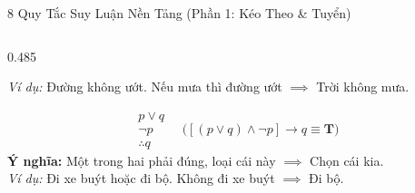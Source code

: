 \documentclass[aspectratio=169, 10pt]{beamer}
\begin{document}
\begin{frame}{8 Quy Tắc Suy Luận Nền Tảng (Phần 1: Kéo Theo \& Tuyển)}
\begin{columns}[t, onlytextwidth]
\begin{column}{0.485\textwidth}
\begin{cozyDef}
        \textit{Ví dụ:} Đường không ướt. Nếu mưa thì đường ướt $\implies$ Trời không mưa.
      \end{cozyDef}
      \vspace{0.02cm}
      \begin{cozyDef}
        \scriptsize
        \vspace{-0.16cm}
        $$\begin{array}{l} p \lor q \\ \neg p \\ \hline \therefore q \end{array} \quad \Big( [(p \lor q) \land \neg p] \to q \equiv \mathbf{T} \Big)$$
        \textbf{Ý nghĩa:} Một trong hai phải đúng, loại cái này $\implies$ Chọn cái kia.\\[2.5pt]
        \textit{Ví dụ:} Đi xe buýt hoặc đi bộ. Không đi xe buýt $\implies$ Đi bộ.
      \end{cozyDef}
    \end{column}
  \end{columns}
\end{frame}
\end{document}
